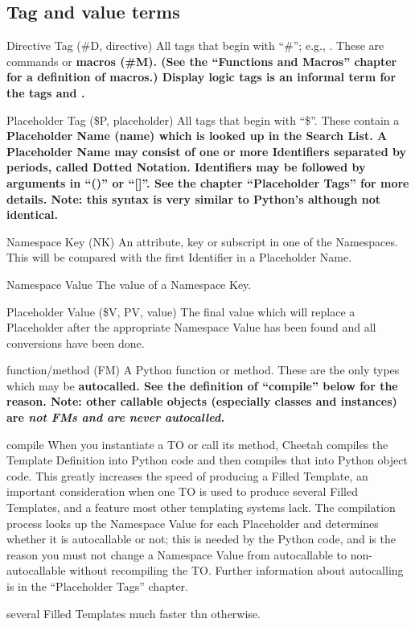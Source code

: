 \subsection{Tag and value terms}

\begin{description}

\item{Directive Tag (#D, directive)}  All tags that begin with ``#''; e.g.,
     .  These are commands or \bf{macros (#M)}.  (See the
     ``Functions and Macros'' chapter for a definition of macros.)
     \bf{Display logic tags} is an informal term for the tags 
      and .

\item{Placeholder Tag (\$P, placeholder)}  All tags that begin with ``\$''.
     These contain a \bf{Placeholder Name (name)} which is looked up in the
     Search List.  A Placeholder Name may consist of one or more
     \bf{Identifiers} separated by periods, called \bf{Dotted Notation}.
     Identifiers may be followed by \bf{arguments} in ``()'' or ``[]''.  See
     the chapter ``Placeholder Tags'' for more details.  Note: this syntax is
     very similar to Python's although not identical.

\item{Namespace Key (NK)}  An attribute, key or subscript in one of the
     Namespaces.  This will be compared with the first Identifier in a
     Placeholder Name.

\item{Namespace Value}  The value of a Namespace Key.

\item{Placeholder Value (\$V, PV, value)}  The final value which will replace
     a Placeholder after the appropriate Namespace Value has been found and all
     conversions have been done.

\item{function/method (FM)}  A Python function or method.  These are the only
     types which may be \bf{autocalled}.  See the definition of ``compile''
     below for the reason.  Note: other callable objects
     (especially classes and instances) are \em{not} FMs and are never
     autocalled.

\item{compile}  When you instantiate a TO or call its 
     method, Cheetah compiles the Template Definition into Python code and then
     compiles that into Python object code.  This greatly increases the speed
     of producing a Filled Template, an important consideration when one TO
     is used to produce several Filled Templates, and a feature most other
     templating systems lack.  The compilation process looks up the Namespace
     Value for each Placeholder and determines whether it is autocallable or
     not; this is needed by the Python code, and is the reason you must not
     change a Namespace Value from autocallable to non-autocallable without
     recompiling the TO.  Further information about autocalling is in the
     ``Placeholder Tags'' chapter.

     several Filled Templates much faster thn otherwise.  

\end{description}

